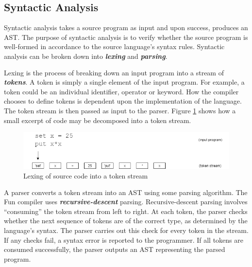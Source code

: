 \documentclass{l4proj}
\begin{document}
\subsection{Syntactic Analysis}
Syntactic analysis takes a source program as input and upon success, produces an AST. The purpose of syntactic analysis is to verify whether the source program is well-formed in accordance to the source language's syntax rules. Syntactic analysis can be broken down into \textit{\textbf{lexing}} and \textit{\textbf{parsing}}.

Lexing is the process of breaking down an input program into a stream of \textit{\textbf{tokens}}. A token is simply a single element of the input program. For example, a token could be an individual identifier, operator or keyword. How the compiler chooses to define tokens is dependent upon the implementation of the language. The token stream is then passed as input to the parser. Figure \ref{fig:token-stream} shows how a small excerpt of code may be decomposed into a token stream.

\begin{figure}[h]
\centering
\includegraphics[scale=0.5]{images/token_stream.png}
\caption{Lexing of source code into a token stream}
\label{fig:token-stream}	
\end{figure}

A parser converts a token stream into an AST using some parsing algorithm. The Fun compiler uses \textit{\textbf{recursive-descent}} parsing. Recursive-descent parsing involves ``consuming'' the token stream from left to right. At each token, the parser checks whether the next sequence of tokens are of the correct type, as determined by the language's syntax. The parser carries out this check for every token in the stream. If any checks fail, a syntax error is reported to the programmer. If all tokens are consumed successfully, the parser outputs an AST representing the parsed program.
\end{document}
